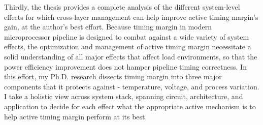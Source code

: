 Thirdly, the thesis provides a complete analysis of the different system-level effects for which cross-layer management can help improve active timing margin's gain, at the author's best effort. Because timing margin in modern microprocessor pipeline is designed to combat against a wide variety of system effects, the optimization and management of active timing margin necessitate a solid understanding of all major effects that affect load environments, so that the power efficiency improvement does not hamper pipeline timing correctness. In this effort, my Ph.D. research dissects timing margin into three major components that it protects against - temperature, voltage, and process variation. I take a holistic view across system stack, spanning circuit, architecture, and application to decide for each effect what the appropriate active mechanism is to help active timing margin perform at its best.

